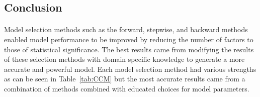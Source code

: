 \documentclass[11pt]{scrartcl} %
\begin{document}

\subsection{Conclusion}
\paragraph{} Model selection methods such as the forward, stepwise, and backward methods enabled model performance to be improved by reducing the number of factors to those of statistical significance.  The best results came from modifying the results of these selection methods with domain specific knowledge to generate a more accurate and powerful model. Each model selection method had various strengths as can be seen in Table~\ref{tab:CCM} but the most accurate results came from a combination of methods combined with educated choices for model parameters. 

\appendix{} 
\pagebreak
\end{document}

